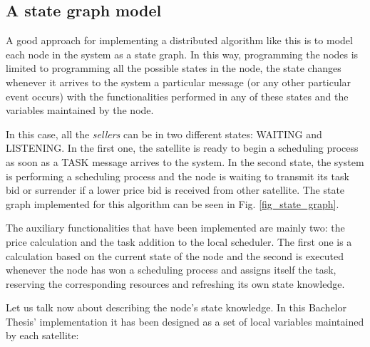 \subsection{A state graph model}

A good approach for implementing a distributed algorithm like this is to model each node in the system as a state graph. In this way, programming the nodes is limited to programming all the possible states in the node, the state changes whenever it arrives to the system a particular message (or any other particular event occurs) with the functionalities performed in any of these states and the variables maintained by the node.

In this case, all the \emph{sellers} can be in two different states: WAITING and LISTENING. In the first one, the satellite is ready to begin a scheduling process as soon as a TASK message arrives to the system. In the second state, the system is performing a scheduling process and the node is waiting to transmit its task bid or surrender if a lower price bid is received from other satellite. The state graph implemented for this algorithm can be seen in Fig. \ref{fig_state_graph}.

The auxiliary functionalities that have been implemented are mainly two: the price calculation and the task addition to the local scheduler. The first one is a calculation based on the current state of the node and the second is executed whenever the node has won a scheduling process and assigns itself the task, reserving the corresponding resources and refreshing its own state knowledge.

Let us talk now about describing the node's state knowledge. In this Bachelor Thesis' implementation it has been designed as a set of local variables maintained by each satellite:

